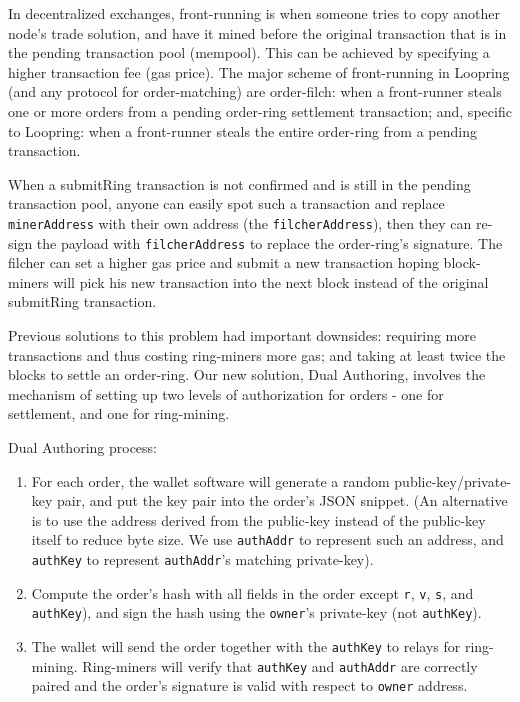 \documentclass[UTF8,nofonts]{article}
\begin{document}
\begin{multicols}{2}
In decentralized exchanges, front-running is when someone tries to copy another node's trade solution, and have it mined before the original transaction that is in the pending transaction pool (mempool). This can be achieved by specifying a higher transaction fee (gas price). The major scheme of front-running in Loopring (and any protocol for order-matching) are order-filch: when a front-runner steals one or more orders from a pending order-ring settlement transaction; and, specific to Loopring: when a front-runner steals the entire order-ring from a pending transaction.


When a submitRing transaction is not confirmed and is still in the pending transaction pool, anyone can easily spot such a transaction and replace \verb|minerAddress| with their own address (the \verb|filcherAddress|), then they can re-sign the payload with \verb|filcherAddress| to replace the order-ring's signature. The filcher can set a higher gas price and submit a new transaction hoping block-miners will pick his new transaction into the next block instead of the original submitRing transaction.

Previous solutions to this problem had important downsides: requiring more transactions and thus costing ring-miners more gas; and taking at least twice the blocks to settle an order-ring.  Our new solution, Dual Authoring\cite{dualauthor}, involves the mechanism of setting up two levels of authorization for orders - one for settlement, and one for ring-mining.

Dual Authoring process:

\begin{enumerate}

	\item For each order, the wallet software will generate a random public-key/private-key pair, and put the key pair into the order's JSON snippet. (An alternative is to use the address derived from the public-key instead of the public-key itself to reduce byte size. We use \verb|authAddr| to represent such an address, and \verb|authKey| to represent \verb|authAddr|'s matching private-key).

	\item Compute the order's hash with all fields in the order except \verb|r|, \verb|v|, \verb|s|, and \verb|authKey|), and sign the hash using the \verb|owner|'s private-key (not \verb|authKey|).

	\item The wallet will send the order together with the \verb|authKey| to  relays for ring-mining. Ring-miners will verify that \verb|authKey| and \verb|authAddr| are correctly paired and the order's signature is valid with respect to \verb|owner| address.


\end{enumerate}
\end{multicols}
\end{document}
